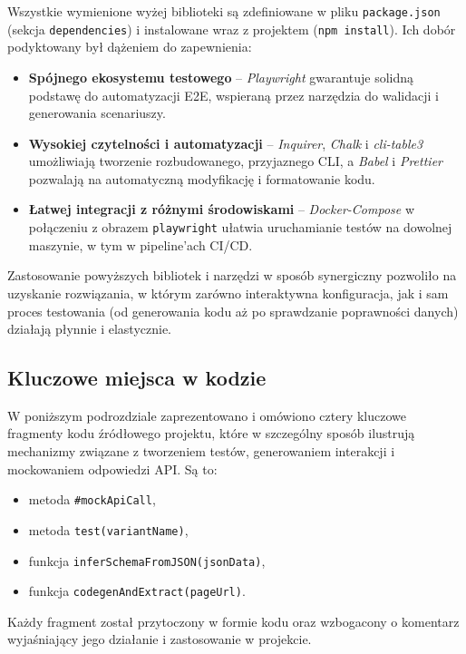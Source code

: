\documentclass[12pt]{report}
\begin{document}
Wszystkie wymienione wyżej biblioteki są zdefiniowane w pliku \texttt{package.json} (sekcja \texttt{dependencies}) i instalowane wraz z projektem (\verb|npm install|). Ich dobór podyktowany był dążeniem do zapewnienia:
\begin{itemize}
    \item \textbf{Spójnego ekosystemu testowego} -- \emph{Playwright} gwarantuje solidną podstawę do automatyzacji E2E, wspieraną przez narzędzia do walidacji i generowania scenariuszy.
    \item \textbf{Wysokiej czytelności i automatyzacji} -- \emph{Inquirer}, \emph{Chalk} i \emph{cli-table3} umożliwiają tworzenie rozbudowanego, przyjaznego CLI, a \emph{Babel} i \emph{Prettier} pozwalają na automatyczną modyfikację i formatowanie kodu.
    \item \textbf{Łatwej integracji z różnymi środowiskami} -- \emph{Docker-Compose} w połączeniu z obrazem \texttt{playwright} ułatwia uruchamianie testów na dowolnej maszynie, w tym w pipeline’ach CI/CD.
\end{itemize}

Zastosowanie powyższych bibliotek i narzędzi w sposób synergiczny pozwoliło na uzyskanie rozwiązania, w którym zarówno interaktywna konfiguracja, jak i sam proces testowania (od generowania kodu aż po sprawdzanie poprawności danych) działają płynnie i elastycznie.

\subsection{Kluczowe miejsca w kodzie}
\label{sec:6.3}

W poniższym podrozdziale zaprezentowano i omówiono cztery kluczowe fragmenty kodu źródłowego projektu, które w szczególny sposób ilustrują mechanizmy związane z tworzeniem testów, generowaniem interakcji i mockowaniem odpowiedzi API. Są to:

\begin{itemize}
  \item metoda \verb|#mockApiCall|,
  \item metoda \verb|test(variantName)|,
  \item funkcja \verb|inferSchemaFromJSON(jsonData)|,
  \item funkcja \verb|codegenAndExtract(pageUrl)|.
\end{itemize}

Każdy fragment został przytoczony w formie kodu oraz wzbogacony o komentarz wyjaśniający jego działanie i zastosowanie w projekcie.
\end{document}
